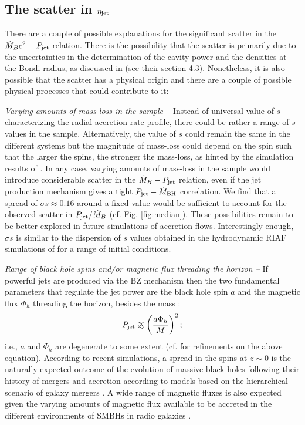 \documentclass[useAMS,usenatbib]{mn2e}
\def\apropto{%
  \def\p{%
    \setbox0=\vbox{\hbox{$\propto$}}%
    \ht0=0.6ex \box0 }%
  \def\s{%
    \vbox{\hbox{$\sim$}}%
  }%
  \mathrel{\raisebox{0.7ex}{%
      \mbox{$\underset{\s}{\p}$}%
    }}%
}
\begin{document}
\subsection{The scatter in $\eta_{\rm jet}$}

There are a couple of possible explanations for the significant scatter in the $\dot{M}_B c^2 - P_{\rm jet}$ relation. There is the possibility that the scatter is primarily due to the uncertainties in the determination of the cavity power and the densities at the Bondi radius, as discussed in \cite{Russell13} (see their section 4.3). Nonetheless, it is also possible that the scatter has a physical origin and there are a couple of possible physical processes that could contribute to it: 

\vspace{0.2cm}
\noindent
{\it Varying amounts of mass-loss in the sample --}
Instead of universal value of $s$ characterizing the radial accretion rate profile, there could be rather a range of $s$-values in the sample. Alternatively, the value of $s$ could remain the same in the different systems but the magnitude of mass-loss could depend on the spin such that the larger the spins, the stronger the mass-loss, as hinted by the simulation results of \cite{Sadowski13sim}.  In any case, varying amounts of mass-loss in the sample would introduce considerable scatter in the $\dot{M}_B - P_{\rm jet}$ relation, even if the jet production mechanism gives a tight $P_{\rm jet} - \dot{M}_{\rm BH}$ correlation. We find that a spread of $\sigma s \approx 0.16$ around a fixed value would be sufficient to account for the observed scatter in $P_{\rm jet}/\dot{M}_B$ (cf. Fig. \ref{fig:median}). These possibilities remain to be better explored in future simulations of accretion flows. Interestingly enough, $\sigma s$ is similar to the dispersion of $s$ values obtained in the hydrodynamic RIAF simulations of \cite{Yuan12,Bu13} for a range of initial conditions. 

\vspace{0.2cm}
\noindent
{\it Range of black hole spins and/or magnetic flux threading the horizon --}
If powerful jets are produced via the BZ mechanism then the two fundamental parameters that regulate the jet power are the black hole spin $a$ and the magnetic flux $\Phi_h$ threading the horizon, besides the mass \citep{Blandford77,Semenov04}:
\begin{equation}
P_{\rm jet} \apropto \left( \frac{a \Phi_h}{M} \right)^2;
\end{equation}
i.e., $a$ and $\Phi_h$ are degenerate to some extent (cf. \citealt{Sasha10} for refinements on the above equation). According to recent simulations, a spread in the spins at $z \sim 0$ is the naturally expected outcome of the evolution of massive black holes following their history of mergers and accretion according to models based on the hierarchical scenario of galaxy mergers \citep{Fanidakis11,Dotti13,Volonteri13}. A wide range of magnetic fluxes is also expected given the varying amounts of magnetic flux available to be accreted in the different environments of SMBHs in radio galaxies \citep{Sikora13}.
\end{document}
